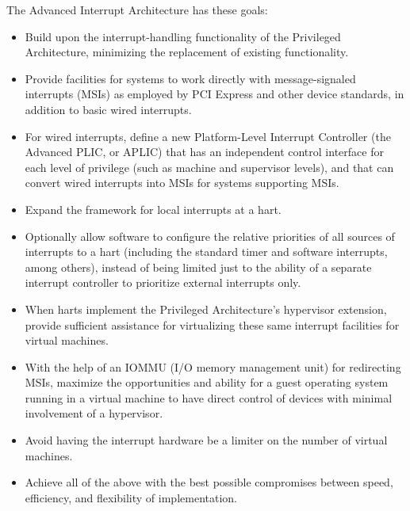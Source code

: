 The {\RISCV} Advanced Interrupt Architecture has these goals:
\begin{itemize}

\item
Build upon the interrupt-handling functionality of the {\RISCV}
Privileged Architecture, minimizing the replacement of existing
functionality.

\item
Provide facilities for {\RISCV} systems to work directly with
message-signaled interrupts (MSIs) as employed by PCI Express and other
device standards, in addition to basic wired interrupts.

\item
For wired interrupts, define a new Platform-Level Interrupt Controller
(the Advanced PLIC, or APLIC)
that has an independent control interface for each
level of privilege (such as {\RISCV} machine and supervisor levels),
and that can convert wired interrupts into MSIs for systems supporting
MSIs.

\item
Expand the framework for local interrupts at a {\RISCV} hart.

\item
Optionally allow software to configure the relative priorities of all
sources of interrupts to a {\RISCV} hart (including the standard timer
and software interrupts, among others), instead of being limited
just to the ability of a separate interrupt controller to prioritize
external interrupts only.

\item
When harts implement the Privileged Architecture's hypervisor
extension, provide sufficient assistance for virtualizing these same
interrupt facilities for virtual machines.

\item
With the help of an \mbox{IOMMU} (I/O memory management unit) for redirecting
MSIs, maximize the opportunities and ability for a guest operating
system running in a virtual machine to have direct control of devices
with minimal involvement of a hypervisor.

\item
Avoid having the interrupt hardware be a limiter on the number of
virtual machines.

\item
Achieve all of the above with the best possible compromises between
speed, efficiency, and flexibility of implementation.

\end{itemize}

